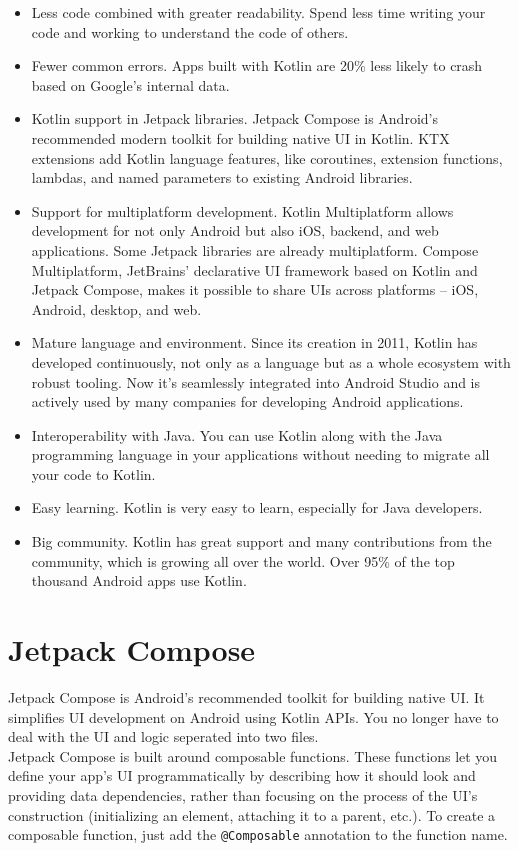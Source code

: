 \documentclass[12pt,oneside]{book}
\begin{document}
\begin{itemize}
  \item Less code combined with greater readability. Spend less time writing your code and working to understand the code of others.
  \item Fewer common errors. Apps built with Kotlin are 20\% less likely to crash based on Google's internal data.
  \item Kotlin support in Jetpack libraries. Jetpack Compose is Android's recommended modern toolkit for building native UI in Kotlin. KTX extensions add Kotlin language features, like coroutines, extension functions, lambdas, and named parameters to existing Android libraries.
  \item Support for multiplatform development. Kotlin Multiplatform allows development for not only Android but also iOS, backend, and web applications. Some Jetpack libraries are already multiplatform. Compose Multiplatform, JetBrains' declarative UI framework based on Kotlin and Jetpack Compose, makes it possible to share UIs across platforms – iOS, Android, desktop, and web.
  \item Mature language and environment. Since its creation in 2011, Kotlin has developed continuously, not only as a language but as a whole ecosystem with robust tooling. Now it's seamlessly integrated into Android Studio and is actively used by many companies for developing Android applications.
  \item Interoperability with Java. You can use Kotlin along with the Java programming language in your applications without needing to migrate all your code to Kotlin.
  \item Easy learning. Kotlin is very easy to learn, especially for Java developers.
  \item Big community. Kotlin has great support and many contributions from the community, which is growing all over the world. Over 95\% of the top thousand Android apps use Kotlin.
\end{itemize}

\section{Jetpack Compose}
Jetpack Compose is Android’s recommended toolkit for building native UI. It simplifies UI development on Android using Kotlin APIs. You no longer have to deal with the UI and logic seperated into two files. \\

Jetpack Compose is built around composable functions. These functions let you define your app's UI programmatically by describing how it should look and providing data dependencies, rather than focusing on the process of the UI's construction (initializing an element, attaching it to a parent, etc.). To create a composable function, just add the \texttt{@Composable} annotation to the function name.
\end{document}
